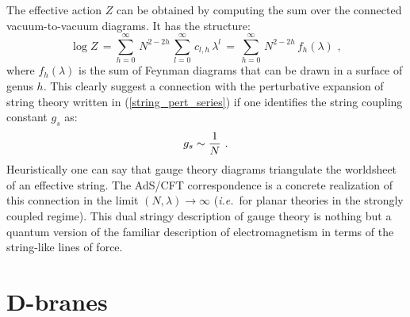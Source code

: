 \documentclass[12pt,notitlepage,a4paper]{article}
\newcommand{\beq}{\begin{equation}}
\newcommand{\eeq}{\end{equation}}
\def\ie{{\emph{i.e.}}}
\begin{document}
The effective action $Z$ can be obtained by computing the sum over the connected vacuum-to-vacuum diagrams. It has the structure:
\beq
\log Z\,=\sum_{h=0}^{\infty}\,N^{2-2h}\,
\sum_{l=0}^{\infty}\,c_{l,h}\,\lambda^{l}\,=\,
\sum_{h=0}^{\infty}\,N^{2-2h}\,f_h(\lambda)\,\,,
\eeq
where $f_h(\lambda)$ is the sum of Feynman diagrams that can be drawn in a surface of genus $h$. This clearly suggest a connection with the perturbative expansion of  string theory  written in (\ref{string_pert_series}) if one identifies the string coupling constant $g_s$ as:
\beq
g_s\sim {1\over N}\,\,.
\eeq
Heuristically one can say that gauge theory diagrams triangulate the worldsheet of an effective string. 
The AdS/CFT correspondence is a concrete realization of this connection in the limit $(N, \lambda)\to\infty$ (\ie\ for planar theories in the strongly coupled regime). This dual stringy description of gauge theory is nothing but a quantum version of the familiar description of electromagnetism in terms of the string-like lines of force. 

\section{D-branes}
\end{document}
